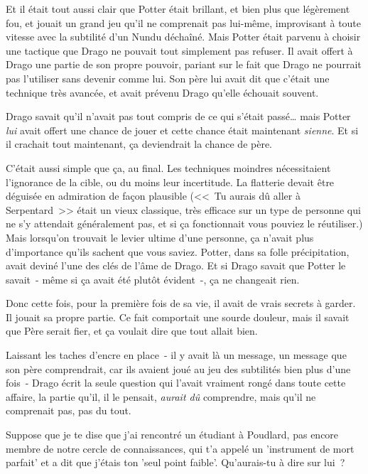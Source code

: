 Et il était tout aussi clair que Potter était brillant, et bien plus que légèrement fou, et jouait un grand jeu qu'il ne comprenait pas lui-même, improvisant à toute vitesse avec la subtilité d'un Nundu déchaîné. Mais Potter était parvenu à choisir une tactique que Drago ne pouvait tout simplement pas refuser. Il avait offert à Drago une partie de son propre pouvoir, pariant sur le fait que Drago ne pourrait pas l'utiliser sans devenir comme lui. Son père lui avait dit que c'était une technique très avancée, et avait prévenu Drago qu'elle échouait souvent.

Drago savait qu'il n'avait pas tout compris de ce qui s'était passé… mais Potter \emph{lui} avait offert une chance de jouer et cette chance était maintenant \emph{sienne}. Et si il crachait tout maintenant, ça deviendrait la chance de père.

C'était aussi simple que ça, au final. Les techniques moindres nécessitaient l'ignorance de la cible, ou du moins leur incertitude. La flatterie devait être déguisée en admiration de façon plausible (<<~Tu aurais dû aller à Serpentard~>> était un vieux classique, très efficace sur un type de personne qui ne s'y attendait généralement pas, et si ça fonctionnait vous pouviez le réutiliser.) Mais lorsqu'on trouvait le levier ultime d'une personne, ça n'avait plus d'importance qu'ils sachent que vous saviez. Potter, dans sa folle précipitation, avait deviné l'une des clés de l'âme de Drago. Et si Drago savait que Potter le savait~- même si ça avait été plutôt évident~-, ça ne changeait rien.

Donc cette fois, pour la première fois de sa vie, il avait de vrais secrets à garder. Il jouait sa propre partie. Ce fait comportait une sourde douleur, mais il savait que Père serait fier, et ça voulait dire que tout allait bien.

Laissant les taches d'encre en place~- il y avait là un message, un message que son père comprendrait, car ils avaient joué au jeu des subtilités bien plus d'une fois~- Drago écrit la seule question qui l'avait vraiment rongé dans toute cette affaire, la partie qu'il, il le pensait, \emph{aurait dû} comprendre, mais qu'il ne comprenait pas, pas du tout.

\begin{writtenNote}

Suppose que je te dise que j'ai rencontré un étudiant à Poudlard, pas encore membre de notre cercle de connaissances, qui t'a appelé un 'instrument de mort parfait' et a dit que j'étais ton 'seul point faible'. Qu'aurais-tu à dire sur lui~?

\end{writtenNote}

